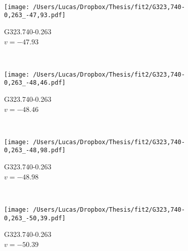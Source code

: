 \begin{figure*}[t]
\begin{subfigure}[t]{0.3\textwidth}
	\end{subfigure}
	~
	\begin{subfigure}[t]{0.3\textwidth}
		\texttt{[image: /Users/Lucas/Dropbox/Thesis/fit2/G323,740-0,263\_-47,93.pdf]}
		\caption[]{G323.740-0.263\\$v=-47.93$\,\kms}
	\end{subfigure}
	~
	\begin{subfigure}[t]{0.3\textwidth}
		\texttt{[image: /Users/Lucas/Dropbox/Thesis/fit2/G323,740-0,263\_-48,46.pdf]}
		\caption[]{G323.740-0.263\\$v=-48.46$\,\kms}
	\end{subfigure}
	~
	\begin{subfigure}[t]{0.3\textwidth}
		\texttt{[image: /Users/Lucas/Dropbox/Thesis/fit2/G323,740-0,263\_-48,98.pdf]}
		\caption[]{G323.740-0.263\\$v=-48.98$\,\kms}
	\end{subfigure}
	~
	\begin{subfigure}[t]{0.3\textwidth}
		\texttt{[image: /Users/Lucas/Dropbox/Thesis/fit2/G323,740-0,263\_-50,39.pdf]}
		\caption[]{G323.740-0.263\\$v=-50.39$\,\kms}
	\end{subfigure}
	~
\end{figure*}
\clearpage
